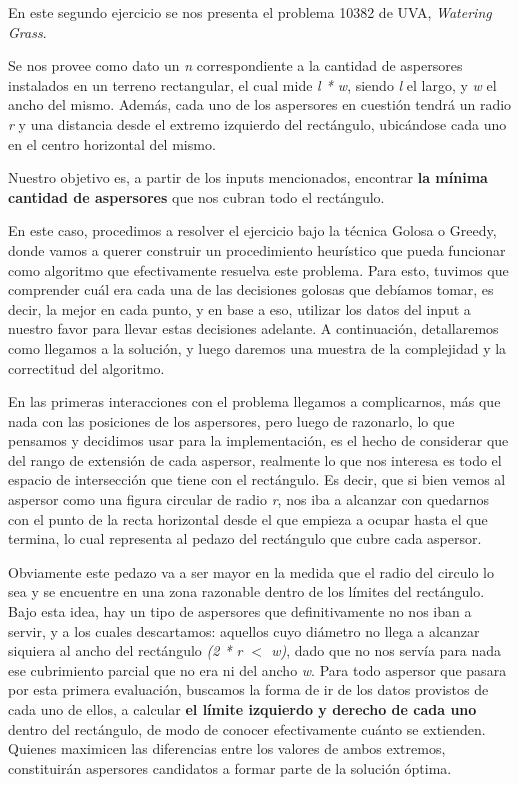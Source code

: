 En este segundo ejercicio se nos presenta el problema 10382 de UVA, \textit{Watering Grass}. \newline

Se nos provee como dato un \textit{n} correspondiente a la cantidad de aspersores instalados en un terreno rectangular, el cual mide \textit{l * w}, siendo \textit{l} el largo, y \textit{w} el ancho del mismo.
Además, cada uno de los aspersores en cuestión tendrá un radio \textit{r} y una distancia desde el extremo izquierdo del rectángulo, ubicándose cada uno en el centro horizontal del mismo. \newline

Nuestro objetivo es, a partir de los inputs mencionados, encontrar \textbf{la mínima cantidad de aspersores} que nos cubran todo el rectángulo. \newline

En este caso, procedimos a resolver el ejercicio bajo la técnica Golosa o Greedy, donde vamos a querer construir un procedimiento heurístico que pueda funcionar como algoritmo que efectivamente resuelva este problema. Para esto, tuvimos que comprender cuál era cada una de las decisiones golosas que debíamos tomar, es decir, la mejor en cada punto, y en base a eso, utilizar los datos del input a nuestro favor para llevar estas decisiones adelante. A continuación, detallaremos como llegamos a la solución, y luego daremos una muestra de la complejidad y la correctitud del algoritmo. \newline

En las primeras interacciones con el problema llegamos a complicarnos, más que nada con las posiciones de los aspersores, pero luego de razonarlo, lo que pensamos y decidimos usar para la implementación, es el hecho de considerar que del rango de extensión de cada aspersor, realmente lo que nos interesa es todo el espacio de intersección que tiene con el rectángulo. Es decir, que si bien vemos al aspersor como una figura circular de radio \textit{r}, nos iba a alcanzar con quedarnos con el punto de la recta horizontal desde el que empieza a ocupar hasta el que termina, lo cual representa al pedazo del rectángulo que cubre cada aspersor. \newline

Obviamente este pedazo va a ser mayor en la medida que el radio del circulo lo sea y se encuentre en una zona razonable dentro de los límites del rectángulo. Bajo esta idea, hay un tipo de aspersores que definitivamente no nos iban a servir, y a los cuales descartamos: aquellos cuyo diámetro no llega a alcanzar siquiera al ancho del rectángulo \textit{(2 * r $<$ w)}, dado que no nos servía para nada ese cubrimiento parcial que no era ni del ancho \textit{w}. Para todo aspersor que pasara por esta primera evaluación, buscamos la forma de ir de los datos provistos de cada uno de ellos, a calcular \textbf{el límite izquierdo y derecho de cada uno} dentro del rectángulo, de modo de conocer efectivamente cuánto se extienden. Quienes maximicen las diferencias entre los valores de ambos extremos, constituirán aspersores candidatos a formar parte de la solución óptima.\newline

